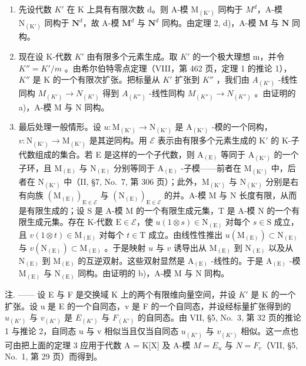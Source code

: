 \begin{enumerate}
\def\labelenumi{\alph{enumi})}
\item
  先设代数 \(K'\) 在 K 上具有有限次数 d。则 A-模 \(\mathrm{M}_{(\mathrm{K}')}\) 同构于 \(M^{d}\)，A-模 \(\mathrm{N}_{(\mathrm{K}')}\) 同构于 \(\mathbf{N}^d\)，故 A-模 \(\mathbf{M}^d\) 与 \(\mathbf{N}^d\) 同构。由定理 2, d)，A-模 \(\mathbf{M}\) 与 \(\mathbf{N}\) 同构。
\item
  现在设 K-代数 \(K'\) 由有限多个元素生成。取 \(K'\) 的一个极大理想 m，并令 \(K'' = K'/m\) 。由希尔伯特零点定理（VIII，第 462 页，定理 1 的推论 1），\(K''\) 是 K 的一个有限次扩张。把标量从 \(K'\) 扩张到 \(K''\) ，我们由 \(A_{(K')}\) -线性同构 \(M_{(K')} \to N_{(K')}\) 得到 \(A_{(K'')}\) -线性同构 \(M_{(K'')} \to N_{(K'')}\) 。由证明的 a)，A-模 M 与 N 同构。
\item
  最后处理一般情形。设 \(u: \mathrm{M}_{(\mathrm{K}')} \to \mathrm{N}_{(\mathrm{K}')}\) 是 \(\mathrm{A}_{(\mathrm{K}')}\) -模的一个同构，\(v: \mathrm{N}_{(\mathrm{K}')} \to \mathrm{M}_{(\mathrm{K}')}\) 是其逆同构。用 \(\mathcal{E}\) 表示由有限多个元素生成的 \(\mathrm{K}'\) 的 K-子代数组成的集合。若 E 是这样的一个子代数，则 \(\mathrm{A}_{(\mathrm{E})}\) 等同于 \(\mathrm{A}_{(\mathrm{K}')}\) 的一个子环，且 \(\mathrm{M}_{(\mathrm{E})}\) 与 \(\mathrm{N}_{(\mathrm{E})}\) 分别等同于 \(\mathrm{A}_{(\mathrm{E})}\) -子模——前者在 \(\mathrm{M}_{(\mathrm{K}')}\) 中，后者在 \(\mathrm{N}_{(\mathrm{K}')}\) 中（II, §7, No.~7, 第 306 页）；此外，\(\mathrm{M}_{(\mathrm{K}')}\) 与 \(\mathrm{N}_{(\mathrm{K}')}\) 分别是右有向族 \((\mathrm{M}_{(\mathrm{E})})_{\mathrm{E} \in \mathcal{E}}\) 与 \((\mathrm{N}_{(\mathrm{E})})_{\mathrm{E} \in \mathcal{E}}\) 的并。A-模 M 与 N 长度有限，从而是有限生成的；设 S 是 A-模 M 的一个有限生成元集，T 是 A-模 N 的一个有限生成元集。存在 K-代数 \(\mathrm{E} \in \mathcal{E}\)，使 \(u(1 \otimes s) \in \mathrm{N}_{(\mathrm{E})}\) 对每个 \(s \in \mathrm{S}\) 成立，且 \(v(1 \otimes t) \in \mathrm{M}_{(\mathrm{E})}\) 对每个 \(t \in \mathrm{T}\) 成立。由线性性推出 \(u(\mathrm{M}_{(\mathrm{E})}) \subset \mathrm{N}_{(\mathrm{E})}\) 与 \(v(\mathrm{N}_{(\mathrm{E})}) \subset \mathrm{M}_{(\mathrm{E})}\) 。于是映射 \(u\) 与 \(v\) 诱导出从 \(\mathrm{M}_{(\mathrm{E})}\) 到 \(\mathrm{N}_{(\mathrm{E})}\) 以及从 \(\mathrm{N}_{(\mathrm{E})}\) 到 \(\mathrm{M}_{(\mathrm{E})}\) 的互逆双射。这些双射显然是 \(\mathrm{A}_{(\mathrm{E})}\) -线性的。于是 \(\mathrm{A}_{(\mathrm{E})}\) -模 \(\mathrm{M}_{(\mathrm{E})}\) 与 \(\mathrm{N}_{(\mathrm{E})}\) 同构。由证明的 b)，A-模 M 与 N 同构。
\end{enumerate}

注. —— 设 E 与 F 是交换域 K 上的两个有限维向量空间，并设 \(K'\) 是 K 的一个扩张。设 u 是 E 的一个自同态，v 是 F 的一个自同态，并设经标量扩张得到的 \(u_{(K')}\) 与 \(v_{(K')}\) 是 \(E_{(K')}\) 与 \(F_{(K')}\) 的自同态。由 VII, §5, No.~3, 第 32 页的推论 1 与推论 2，自同态 u 与 v 相似当且仅当自同态 \(u_{(K')}\) 与 \(v_{(K')}\) 相似。这一点也可由把上面的定理 3 应用于代数 A = K{[}X{]} 及 A-模 \(M = E_u\) 与 \(N = F_v\)（VII, §5, No.~1, 第 29 页）而得到。

